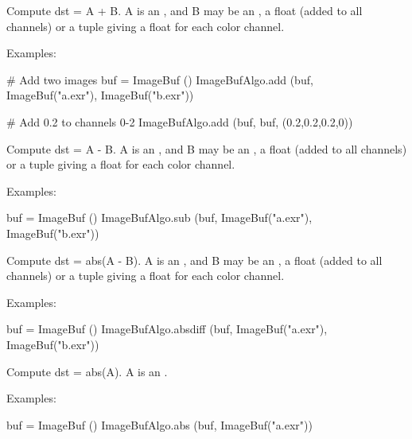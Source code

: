  

Compute {\cf dst = A + B}.  {\cf A} is an \ImageBuf, and {\cf B}  may
be an \ImageBuf, a {\cf float} (added to all channels) or a tuple giving a
{\cf float} for each color channel.

\smallskip
\noindent Examples:
\begin{code}
    # Add two images
    buf = ImageBuf ()
    ImageBufAlgo.add (buf, ImageBuf("a.exr"), ImageBuf("b.exr"))

    # Add 0.2 to channels 0-2 
    ImageBufAlgo.add (buf, buf, (0.2,0.2,0.2,0))
\end{code}
\apiend


 

Compute {\cf dst = A - B}.  {\cf A} is an \ImageBuf, and {\cf B}  may
be an \ImageBuf, a {\cf float} (added to all channels) or a tuple giving a
{\cf float} for each color channel.

\smallskip
\noindent Examples:
\begin{code}
    buf = ImageBuf ()
    ImageBufAlgo.sub (buf, ImageBuf("a.exr"), ImageBuf("b.exr"))
\end{code}
\apiend


 

Compute {\cf dst = abs(A - B)}.  {\cf A} is an \ImageBuf, and {\cf B}  may
be an \ImageBuf, a {\cf float} (added to all channels) or a tuple giving a
{\cf float} for each color channel.

\smallskip
\noindent Examples:
\begin{code}
    buf = ImageBuf ()
    ImageBufAlgo.absdiff (buf, ImageBuf("a.exr"), ImageBuf("b.exr"))
\end{code}
\apiend


 

Compute {\cf dst = abs(A)}.  {\cf A} is an \ImageBuf.

\smallskip
\noindent Examples:
\begin{code}
    buf = ImageBuf ()
    ImageBufAlgo.abs (buf, ImageBuf("a.exr"))
\end{code}
\apiend


